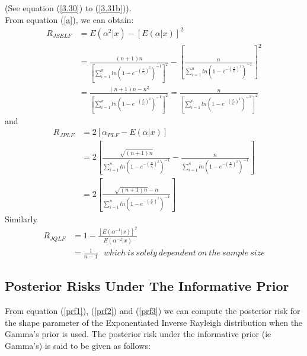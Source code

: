 \documentclass[a4paper,12pt]{report}
\newcommand{\para}{\hspace{0.5cm}}
\begin{document}
\noindent (See equation (\ref{3.30}) to (\ref{3.31b})).\\
From equation (\ref{a}), we can obtain:
\begin{equation}\label{rselfj}
\begin{split}
R_{JSELF}&=E(\alpha^2|x)-\left[E(\alpha|x)\right]^2\\
&=\frac{(n+1)n}{\left[\sum\limits_{ i=1 }^{n}ln\left(1-e^{-\left(\frac{\sigma}{x_i}\right)^2}\right)^{-1}\right]^2}-\left[\frac{n}{\sum\limits_{ i=1 }^{n}ln\left(1-e^{-\left(\frac{\sigma}{x_i}\right)^2}\right)^{-1}}\right]^2\\
&=\frac{(n+1)n-n^2}{\left[\sum\limits_{ i=1 }^{n}ln\left(1-e^{-\left(\frac{\sigma}{x_i}\right)^2}\right)^{-1}\right]^2}=\frac{n}{\left[\sum\limits_{ i=1 }^{n}ln\left(1-e^{-\left(\frac{\sigma}{x_i}\right)^2}\right)^{-1}\right]^2}
\end{split}
\end{equation}
and
\begin{equation}\label{rplfj}
\begin{split}
R_{JPLF}&= 2\left[ {{\alpha _{PLF}} - E\left( {\alpha |x} \right)} \right]\\
&= 2\left[ {{\frac{\sqrt{(n+1)n}}{\sum\limits_{ i=1 }^{n}ln\left(1-e^{-\left(\frac{\sigma}{x_i}\right)^2}\right)^{-1}}} - \frac{n}{\sum\limits_{ i=1 }^{n}ln\left(1-e^{-\left(\frac{\sigma}{x_i}\right)^2}\right)^{-1}}} \right]\\
&=2\left[\frac{\sqrt{(n+1)n}-n}{\sum\limits_{ i=1 }^{n}ln\left(1-e^{-\left(\frac{\sigma}{x_i}\right)^2}\right)^{-1}}\right]
\end{split}
\end{equation}
Similarly
\begin{equation}\label{rqlfj}
\begin{split}
R_{JQLF}&= 1-\frac{[E(\alpha^{-1}|x)]^2}{E(\alpha^{-2}|x)}\\
&=\frac{1}{n-1} \ \ \ which \ is \ solely \ dependent\ on \ the \ sample \ size
\end{split}
\end{equation}

\subsection{Posterior Risks Under The Informative Prior}
\noindent\para From equation (\ref{prf1}), (\ref{prf2}) and (\ref{prf3}) we can compute the posterior risk for the shape parameter of the Exponentiated Inverse Rayleigh distribution when the Gamma's prior is used. The posterior risk under the informative prior (ie Gamma's) is said to be given as follows:\\
\end{document}
